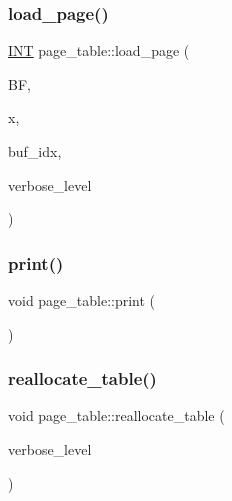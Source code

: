 \subsubsection{\texorpdfstring{load\+\_\+page()}{load\_page()}}
{\footnotesize\ttfamily \mbox{\hyperlink{galois_8h_a09fddde158a3a20bd2dcadb609de11dc}{I\+NT}} page\+\_\+table\+::load\+\_\+page (\begin{DoxyParamCaption}\item[{\mbox{\hyperlink{discreta_8h_a4966414b761cd8d10ba385fe5e7c07fc}{Buffer}} $\ast$}]{BF,  }\item[{\mbox{\hyperlink{galois_8h_a09fddde158a3a20bd2dcadb609de11dc}{I\+NT}}}]{x,  }\item[{\mbox{\hyperlink{galois_8h_a09fddde158a3a20bd2dcadb609de11dc}{I\+NT}}}]{buf\+\_\+idx,  }\item[{\mbox{\hyperlink{galois_8h_a09fddde158a3a20bd2dcadb609de11dc}{I\+NT}}}]{verbose\+\_\+level }\end{DoxyParamCaption})}

\mbox{\label{classpage__table_a8cc167e59ef8166bfe511c5a950b8fc0}} 
\subsubsection{\texorpdfstring{print()}{print()}}
{\footnotesize\ttfamily void page\+\_\+table\+::print (\begin{DoxyParamCaption}{ }\end{DoxyParamCaption})}

\mbox{\label{classpage__table_ae38b42623cb168c948dad1e3765714f1}} 
\subsubsection{\texorpdfstring{reallocate\+\_\+table()}{reallocate\_table()}}
{\footnotesize\ttfamily void page\+\_\+table\+::reallocate\+\_\+table (\begin{DoxyParamCaption}\item[{\mbox{\hyperlink{galois_8h_a09fddde158a3a20bd2dcadb609de11dc}{I\+NT}}}]{verbose\+\_\+level }\end{DoxyParamCaption})}


